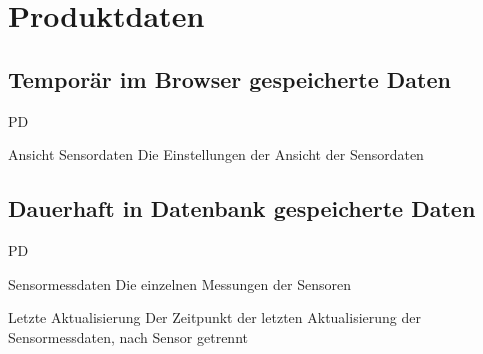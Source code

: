 \section{Produktdaten}

\subsection{Temporär im Browser gespeicherte Daten}
\begin{Kriterien}{PD}
    \item Ansicht Sensordaten
        Die Einstellungen der Ansicht der Sensordaten
\end{Kriterien}

\subsection{Dauerhaft in Datenbank gespeicherte Daten}
\begin{Kriterien}{PD}
    \item Sensormessdaten
        Die einzelnen Messungen der Sensoren
    \item Letzte Aktualisierung
        Der Zeitpunkt der letzten Aktualisierung der Sensormessdaten, nach Sensor getrennt
\end{Kriterien}